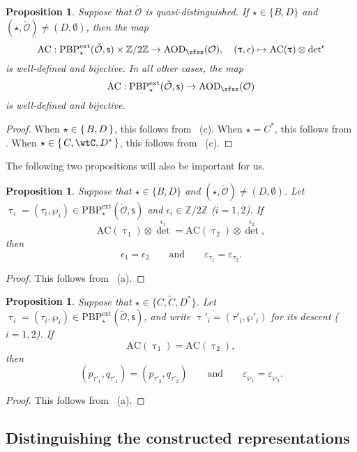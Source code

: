 \documentclass[12pt,a4paper]{amsart}
\newcommand{\CO}{{\mathcal {O}}}
\newcommand{\Z}{\mathbb{Z}}
\numberwithin{equation}{section}
\newtheorem{prop}[thm]{Proposition}
\theoremstyle{remark}
\def\PBPe{\mathrm{PBP}^{\mathrm{ext}}}
\begin{document}
\begin{prop}\label{thmac3}
Suppose that  $\check \CO$ is quasi-distinguished.  If $\star\in \{B,D\}$ and $(\star, \check \CO)\neq (D, \emptyset)$, then  the map
\[
\mathrm{AC}: \PBPe_\star(\check \CO,\mathsf s)\times \Z/2\Z \rightarrow  \mathrm{AOD}_{\sfss}(\CO),\quad (\uptau, \epsilon)\mapsto \mathrm{AC}(\uptau)\otimes {\det}^{\epsilon}
\]
is well-defined and bijective. In all other cases, the
map
\[
\mathrm{AC}: \PBPe_\star(\check \CO,\mathsf s)\rightarrow \mathrm{AOD}_{\sfss}(\CO)
\]
is well-defined and bijective.
\end{prop}
\begin{proof}
When $\star\in \set{B,D}$, this follows from ~(c).
When $\star = C^{*}$, this follows from .
When $\star\in \set{C,\wtC,D^{*}}$, this follows from ~(c).
\end{proof}

The following two propositions will also be important for us.
\begin{prop}\label{thmac4}
Suppose that  $\star\in \{B,D\}$ and $(\star, \check \CO)\neq (D, \emptyset)$. Let $\uptau_i=(\tau_i, \wp_i)\in \PBPe_\star(\check \CO,\mathsf s)$ and $\epsilon_i\in \Z/2\Z$ ($i=1,2$).   If
\[
  \mathrm{AC}(\uptau_1)\otimes {\det}^{\epsilon_1}= \mathrm{AC}(\uptau_2)\otimes {\det}^{\epsilon_2},
\]
then
\[
  \epsilon_1=\epsilon_2\qquad\textrm{and}\qquad \varepsilon_{\tau_1}=\varepsilon_{\tau_2}.
\]
 \end{prop}
\begin{proof}
  This follows from ~(a).
\end{proof}

\begin{prop}\label{thmac5}
Suppose that  $\star\in \{C,\widetilde C, D^*\}$. Let $\uptau_i=(\tau_i, \wp_i)\in \PBPe_\star(\check \CO,\mathsf s)$, and write $\uptau'_i=(\tau'_i, \wp'_i)$ for its descent ($i=1,2$).   If
\[
  \mathrm{AC}(\uptau_1)= \mathrm{AC}(\uptau_2),
\]
then
\[
 ( p_{\tau'_1}, q_{\tau'_1})=( p_{\tau'_2}, q_{\tau'_2})\qquad\textrm{and}\qquad \varepsilon_{\wp_1}=\varepsilon_{\wp_2}.
\]
 \end{prop}

\begin{proof}
  This follows from ~(a).
\end{proof}


\subsection{Distinguishing the constructed representations}\label{secd}
\end{document}
